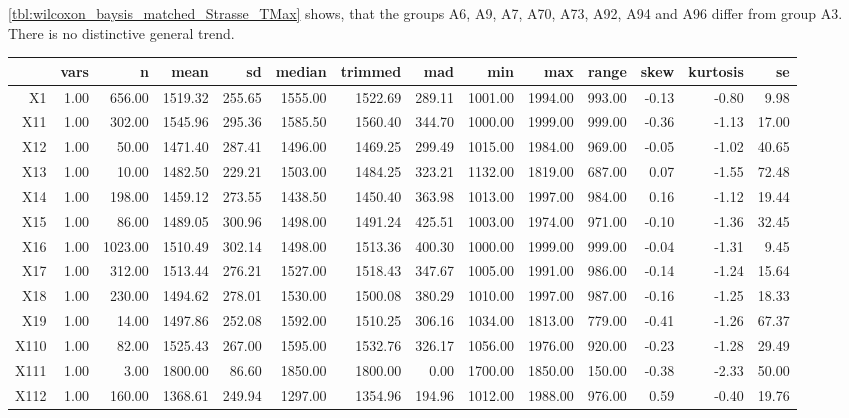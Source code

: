 \cref{tbl:wilcoxon_baysis_matched_Strasse_TMax} shows, that the groups A6, A9, A7, A70, A73, A92, A94 and A96 differ from group A3. There is no distinctive general trend.
\begin{table}[ht!]
	\tiny
	\centering
  \begin{tabular}{rrrrrrrrrrrrrr}
    \hline
   & vars & n & mean & sd & median & trimmed & mad & min & max & range & skew & kurtosis & se \\ 
    \hline
  X1 & 1.00 & 656.00 & 1519.32 & 255.65 & 1555.00 & 1522.69 & 289.11 & 1001.00 & 1994.00 & 993.00 & -0.13 & -0.80 & 9.98 \\ 
    X11 & 1.00 & 302.00 & 1545.96 & 295.36 & 1585.50 & 1560.40 & 344.70 & 1000.00 & 1999.00 & 999.00 & -0.36 & -1.13 & 17.00 \\ 
    X12 & 1.00 & 50.00 & 1471.40 & 287.41 & 1496.00 & 1469.25 & 299.49 & 1015.00 & 1984.00 & 969.00 & -0.05 & -1.02 & 40.65 \\ 
    X13 & 1.00 & 10.00 & 1482.50 & 229.21 & 1503.00 & 1484.25 & 323.21 & 1132.00 & 1819.00 & 687.00 & 0.07 & -1.55 & 72.48 \\ 
    X14 & 1.00 & 198.00 & 1459.12 & 273.55 & 1438.50 & 1450.40 & 363.98 & 1013.00 & 1997.00 & 984.00 & 0.16 & -1.12 & 19.44 \\ 
    X15 & 1.00 & 86.00 & 1489.05 & 300.96 & 1498.00 & 1491.24 & 425.51 & 1003.00 & 1974.00 & 971.00 & -0.10 & -1.36 & 32.45 \\ 
    X16 & 1.00 & 1023.00 & 1510.49 & 302.14 & 1498.00 & 1513.36 & 400.30 & 1000.00 & 1999.00 & 999.00 & -0.04 & -1.31 & 9.45 \\ 
    X17 & 1.00 & 312.00 & 1513.44 & 276.21 & 1527.00 & 1518.43 & 347.67 & 1005.00 & 1991.00 & 986.00 & -0.14 & -1.24 & 15.64 \\ 
    X18 & 1.00 & 230.00 & 1494.62 & 278.01 & 1530.00 & 1500.08 & 380.29 & 1010.00 & 1997.00 & 987.00 & -0.16 & -1.25 & 18.33 \\ 
    X19 & 1.00 & 14.00 & 1497.86 & 252.08 & 1592.00 & 1510.25 & 306.16 & 1034.00 & 1813.00 & 779.00 & -0.41 & -1.26 & 67.37 \\ 
    X110 & 1.00 & 82.00 & 1525.43 & 267.00 & 1595.00 & 1532.76 & 326.17 & 1056.00 & 1976.00 & 920.00 & -0.23 & -1.28 & 29.49 \\ 
    X111 & 1.00 & 3.00 & 1800.00 & 86.60 & 1850.00 & 1800.00 & 0.00 & 1700.00 & 1850.00 & 150.00 & -0.38 & -2.33 & 50.00 \\ 
    X112 & 1.00 & 160.00 & 1368.61 & 249.94 & 1297.00 & 1354.96 & 194.96 & 1012.00 & 1988.00 & 976.00 & 0.59 & -0.40 & 19.76 \\ 

\end{tabular}
\end{table}
